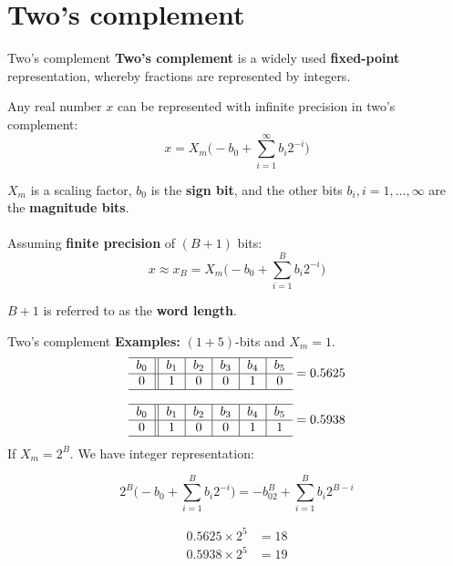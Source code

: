 \documentclass[10pt, aspectratio=169, handout]{beamer}
\begin{document}
\section{Two's complement}
\begin{frame}{Two's complement}
\textbf{Two's complement} is a widely used \textbf{fixed-point} representation, whereby fractions are represented by integers.

Any real number $x$ can be represented with infinite precision in two's complement:
\begin{equation*}
x = X_m\bigg(-b_0 + \sum_{i=1}^{\infty}b_i2^{-i}\bigg) \tag{infinite precision}
\end{equation*}

$X_m$ is a scaling factor, $b_0$ is the \textbf{sign bit}, and the other bits $b_i, i = 1, \ldots, \infty$ are the \textbf{magnitude bits}.
~\\
~\\

\pause
Assuming \textbf{finite precision} of $(B+1)$ bits: 
\begin{equation}
x \approx x_B=  X_m\bigg(-b_0 + \sum_{i=1}^{B}b_i2^{-i}\bigg) \tag{$B+1$ bits precision}
\end{equation}

$B+1$ is referred to as the \textbf{word length}.
\end{frame}

%
\begin{frame}{Two's complement}
\textbf{Examples:} $(1+5)$-bits and $X_m = 1$. 
\begin{equation*}
\begin{tabular}{c||c|c|c|c|c}
\hline
$b_0$ & $b_1$ & $b_2$ & $b_3$ & $b_4$ & $b_5$ \\
\hline
$0$ & $1$ & $0$ & $0$ & $1$ & $0$ \\
\hline
\end{tabular} = 0.5625
\end{equation*}

\begin{equation*}
	\begin{tabular}{c||c|c|c|c|c}
	\hline
	$b_0$ & $b_1$ & $b_2$ & $b_3$ & $b_4$ & $b_5$ \\
	\hline
	$0$ & $1$ & $0$ & $0$ & $1$ & $1$ \\
	\hline
	\end{tabular} = 0.5938
\end{equation*}
If $X_m = 2^B$. We have integer representation:  

\begin{equation*}
	2^B\bigg(-b_0 + \sum_{i=1}^{B}b_i2^{-i}\bigg) = -b_02^B + \sum_{i=1}^{B}b_i2^{B-i}
\end{equation*}

\begin{align*}
	0.5625\times 2^5 &= 18 \\
	0.5938\times 2^5 &= 19
\end{align*}
\end{frame}
\end{document}
